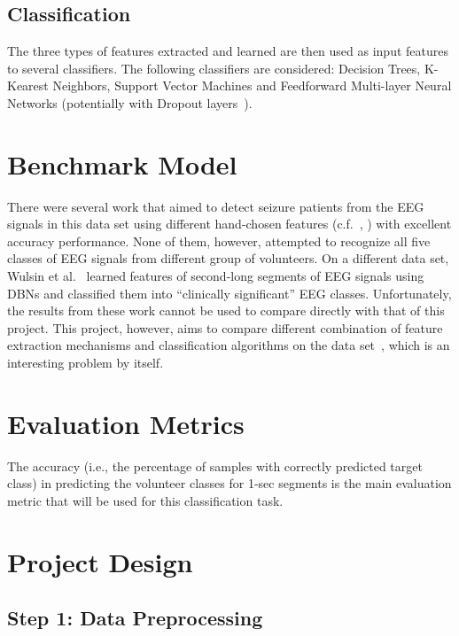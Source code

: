 \documentclass[12pt]{article}
\begin{document}
\subsection{Classification}

The three types of features extracted and learned are then used as input features to several classifiers. The following classifiers are considered: Decision Trees, K-Kearest Neighbors, Support Vector Machines and Feedforward Multi-layer Neural Networks (potentially with Dropout layers~\cite{srivastava2014dropout}).

\section{Benchmark Model}

There were several work that aimed to detect seizure patients from the EEG signals in this data set using different hand-chosen features (c.f.~\cite{nigam2004neural}, \cite{kabir2016epileptic}) with excellent accuracy performance. None of them, however, attempted to recognize all five classes of EEG signals from different group of volunteers. On a different data set, Wulsin et al.~\cite{wulsin2011modeling} learned features of second-long segments of EEG signals using DBNs and classified them into ``clinically significant'' EEG classes. Unfortunately, the results from these work cannot be used to compare directly with that of this project. This project, however, aims to compare different combination of feature extraction mechanisms and classification algorithms on the data set~\cite{andrzejak2001indications}, which is an interesting problem by itself.

\section{Evaluation Metrics}

The accuracy (i.e., the percentage of samples with correctly predicted target class) in predicting the volunteer classes for 1-sec segments is the main evaluation metric that will be used for this classification task.

\section{Project Design}

\subsection{Step 1: Data Preprocessing}
\end{document}
